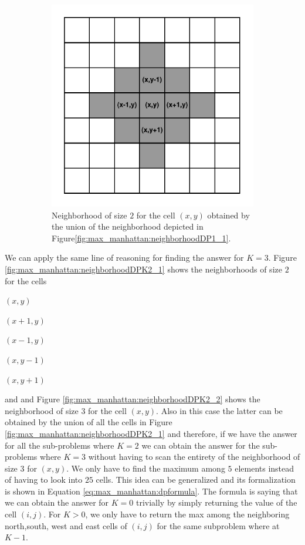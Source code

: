\begin{figure}
    \begin{subfigure}[t]{0.4\textwidth}
        \centering
        \includegraphics[width=\textwidth]{sources/max_manhattan/images/neighborhoodDP1_2}
        \caption[]{Neighborhood of size $2$ for the cell $(x,y)$ obtained by the union of the
        neighborhood depicted in Figure\ref{fig:max_manhattan:neighborhoodDP1_1}.}
        \label{fig:max_manhattan:neighborhoodDP1_2}
     \end{subfigure}
     \label{}
     \caption{}
\end{figure}

We can apply the same line of reasoning for finding the answer for $K=3$. Figure
\ref{fig:max_manhattan:neighborhoodDPK2_1} shows  the neighborhoods of size $2$ for the cells 
\begin{itemize*}
    \item $(x,y)$
    \item $(x+1,y)$
    \item $(x-1,y)$
    \item $(x,y-1)$
    \item $(x,y+1)$ \end{itemize*} and and Figure \ref{fig:max_manhattan:neighborhoodDPK2_2} shows
the neighborhood of size $3$ for the cell $(x,y)$. Also in this case the latter can be obtained by
the union of all the cells in Figure \ref{fig:max_manhattan:neighborhoodDPK2_1} and therefore, if we
have the answer for all the sub-problems where $K=2$ we can obtain the answer for the sub-problems
where $K=3$ without having to scan the entirety of the neighborhood of size $3$ for $(x,y)$. We only
have to find the maximum among $5$ elements instead of having to look into $25$ cells. This idea can
be generalized and its formalization is shown in Equation \ref{eq:max_manhattan:dpformula}. The
formula is saying that we can obtain the answer for $K=0$ trivially by simply returning the value of
the cell $(i,j)$. For $K>0$, we only have to return the max among the neighboring north,south, west
and east cells of $(i,j)$ for the same subproblem where at $K-1$.

